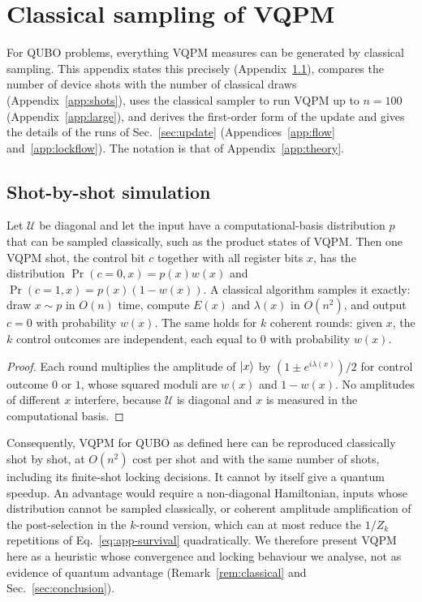 
\section{Classical sampling of VQPM}
\setcounter{equation}{0}
\renewcommand{\theequation}{\thesection\arabic{equation}}
\label{app:sampling}
For QUBO problems, everything VQPM measures can be generated by classical sampling. This appendix states this precisely (Appendix~\ref{app:classical}), compares the number of device shots with the number of classical draws (Appendix~\ref{app:shots}), uses the classical sampler to run VQPM up to $n=100$ (Appendix~\ref{app:large}), and derives the first-order form of the update and gives the details of the runs of Sec.~\ref{sec:update} (Appendices~\ref{app:flow} and~\ref{app:lockflow}). The notation is that of Appendix~\ref{app:theory}.

\subsection{Shot-by-shot simulation}
\label{app:classical}
\begin{proposition}
\label{prop:classical}
Let $\mathcal{U}$ be diagonal and let the input have a computational-basis distribution $p$ that can be sampled classically, such as the product states of VQPM. Then one VQPM shot, the control bit $c$ together with all register bits $x$, has the distribution $\Pr(c=0,x)=p(x)w(x)$ and $\Pr(c=1,x)=p(x)(1-w(x))$. A classical algorithm samples it exactly: draw $x\sim p$ in $O(n)$ time, compute $E(x)$ and $\lambda(x)$ in $O(n^2)$, and output $c=0$ with probability $w(x)$. The same holds for $k$ coherent rounds: given $x$, the $k$ control outcomes are independent, each equal to $0$ with probability $w(x)$.
\end{proposition}
\begin{proof}
Each round multiplies the amplitude of $\left|x\right\rangle$ by $(1\pm e^{i\lambda(x)})/2$ for control outcome $0$ or $1$, whose squared moduli are $w(x)$ and $1-w(x)$. No amplitudes of different $x$ interfere, because $\mathcal{U}$ is diagonal and $x$ is measured in the computational basis.
\end{proof}

Consequently, VQPM for QUBO as defined here can be reproduced classically shot by shot, at $O(n^2)$ cost per shot and with the same number of shots, including its finite-shot locking decisions. It cannot by itself give a quantum speedup. An advantage would require a non-diagonal Hamiltonian, inputs whose distribution cannot be sampled classically, or coherent amplitude amplification of the post-selection in the $k$-round version, which can at most reduce the $1/Z_k$ repetitions of Eq.~\eqref{eq:app-survival} quadratically. We therefore present VQPM here as a heuristic whose convergence and locking behaviour we analyse, not as evidence of quantum advantage (Remark~\ref{rem:classical} and Sec.~\ref{sec:conclusion}).

